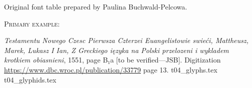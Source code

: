 \documentclass[12pt]{article}
\newcommand{\bg}{\begingl}
\begin{document}
\newpage



\begin{flushleft}
    \label{fig:t02}
    
    \medskip
    
      Original font table prepared by Paulina Buchwald-Pelcowa.

      \bigskip

        \textsc{Primary example:}

  \textit{Testamentu Nowego Czesc Pierwsza Czterzei Euangelistowie
    swieći, Mattheusz, Marek, Lukasz I Ian, Z Greckiego ięzyka na
    Polski przelozeni i wykladem krotkiem obiasnieni}, 1551, page
  {\Junicode B₁a} [to be verified---JSB].  Digitization
  \url{https://www.dbc.wroc.pl/publication/33779} page 13.
 {t04_glyphs.tex}
 {t04_glyphids.tex}


\end{flushleft}
\end{document}
